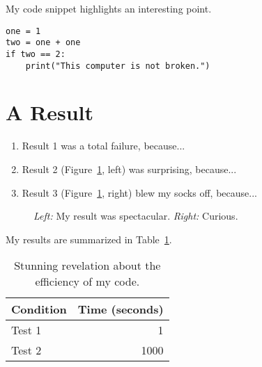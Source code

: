 My code snippet highlights an interesting point.
\begin{lstlisting}
one = 1
two = one + one
if two == 2:
    print("This computer is not broken.")

\end{lstlisting}

\section*{A Result}

\begin{enumerate}
    \item Result 1 was a total failure, because...
    \item Result 2 (Figure~\ref{fig:result1}, left) was surprising, because...
    \item Result 3 (Figure~\ref{fig:result1}, right) blew my socks off, because...
\end{enumerate}

\begin{figure}[h]
    \centering
    \caption{\emph{Left:} My result was spectacular. \emph{Right:} Curious.}
    \label{fig:result1}
\end{figure}

My results are summarized in Table~\ref{tab:table1}.

\begin{table}[h]
    \centering
    \begin{tabular}{lr}
        \toprule
        Condition & Time (seconds) \\
        \midrule
        Test 1 & 1 \\
        Test 2 & 1000 \\
        \bottomrule
    \end{tabular}
    \caption{Stunning revelation about the efficiency of my code.}
    \label{tab:table1}
\end{table}


